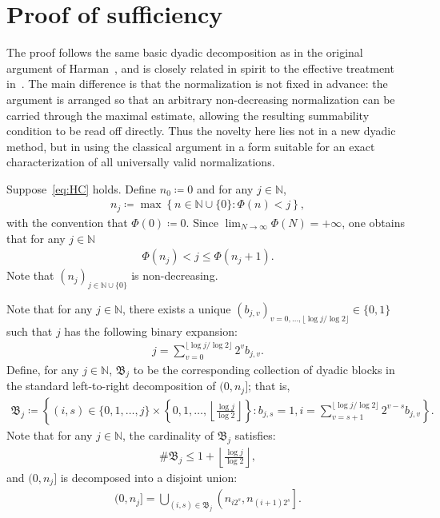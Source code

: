 \documentclass[12pt,reqno]{amsart}
\theoremstyle{definition}
\theoremstyle{plain}
\begin{document}
\section{Proof of sufficiency}\label{sec:upper-proof}

The proof follows the same basic dyadic decomposition as in the original argument of Harman~\cite{Harman1998}, and is closely related in spirit to the effective treatment in~\cite{LeeScoones2025}. The main difference is that the normalization is not fixed in advance: the argument is arranged so that an arbitrary non-decreasing normalization can be carried through the maximal estimate, allowing the resulting summability condition to be read off directly. Thus the novelty here lies not in a new dyadic method, but in using the classical argument in a form suitable for an exact characterization of all universally valid normalizations.

Suppose~\eqref{eq:HC} holds. Define $n_0\coloneqq0$ and for any $j\in\mathbb{N}$,
\begin{align}
\label{eq:nj-definition}
    n_j
    \coloneqq
    \max\left\{n\in\mathbb{N}\cup\{0\}:\Phi(n)<j\right\},
\end{align}
with the convention that $\Phi(0)\coloneqq0$. Since $\lim_{N\to\infty}\Phi(N)=+\infty$, one obtains that for any $j\in\mathbb{N}$
\begin{align}
\label{eq:nj-basic}
    \Phi(n_j)<j\leq\Phi(n_j+1).
\end{align}
Note that $(n_j)_{j\in\mathbb{N}\cup\{0\}}$ is non-decreasing.

Note that for any $j\in\mathbb{N}$, there exists a unique $(b_{j,v})_{v=0,\ldots,\lfloor\log j/\log2\rfloor}\in\{0,1\}$ such that $j$ has the following binary expansion:
\begin{align*}
    j
    =
    \sum_{v=0}^{\lfloor\log j/\log2\rfloor}
    2^v b_{j,v}.
\end{align*}
Define, for any $j\in\mathbb{N}$, $\mathfrak B_j$ to be the corresponding collection of dyadic blocks in the standard left-to-right decomposition of $(0,n_j]$; that is,
\begin{align*}
    \mathfrak B_j
    \coloneqq
    \left\{
        (i,s)\in
        \{0,1,\ldots,j\}\times
        \left\{0,1,\ldots,\left\lfloor\frac{\log{j}}{\log{2}}\right\rfloor\right\}:
        b_{j,s}=1,
        i=
        \sum_{v=s+1}^{\lfloor\log j/\log2\rfloor}
        2^{v-s}b_{j,v}
    \right\}.
\end{align*}
Note that for any $j\in\mathbb{N}$, the cardinality of $\mathfrak B_j$ satisfies:
\begin{align}
\label{eq:binary-block-count}
    \#\mathfrak B_j
    \leq
    1+\left\lfloor\frac{\log j}{\log2}\right\rfloor,
\end{align}
and $(0,n_j]$ is decomposed into a disjoint union:
\begin{align*}
    (0,n_j]
    = \bigcup_{(i,s)\in\mathfrak B_j} \left(n_{i2^s},n_{(i+1)2^s}\right].
\end{align*}
\end{document}

